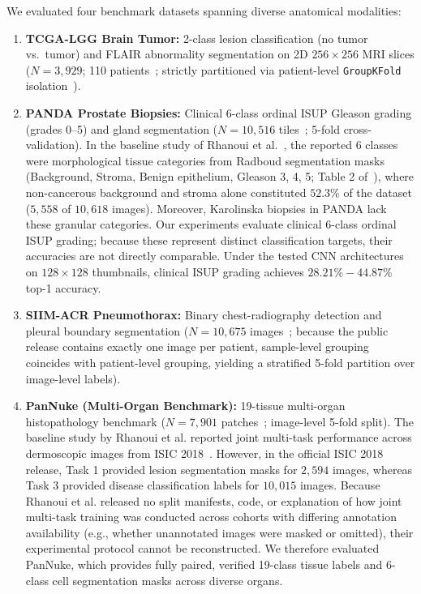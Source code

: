 \documentclass[preprint,12pt]{elsarticle}
\begin{document}
We evaluated four benchmark datasets spanning diverse anatomical modalities:
\begin{enumerate}
    \item \textbf{TCGA-LGG Brain Tumor:} 2-class lesion classification (no tumor vs.\ tumor) and FLAIR abnormality segmentation on 2D $256 \times 256$ MRI slices ($N=3,929$; 110 patients~\cite{buda2019lgg}; strictly partitioned via patient-level \texttt{GroupKFold} isolation~\cite{pedregosa2011sklearn}).
    \item \textbf{PANDA Prostate Biopsies:} Clinical 6-class ordinal ISUP Gleason grading (grades 0--5) and gland segmentation ($N=10,516$ tiles~\cite{bulten2022artificial}; 5-fold cross-validation). In the baseline study of Rhanoui et al.~\cite{rhanoui2025multitask}, the reported 6 classes were morphological tissue categories from Radboud segmentation masks (Background, Stroma, Benign epithelium, Gleason 3, 4, 5; Table 2 of~\cite{rhanoui2025multitask}), where non-cancerous background and stroma alone constituted $52.3\%$ of the dataset ($5,558$ of $10,618$ images). Moreover, Karolinska biopsies in PANDA lack these granular categories. Our experiments evaluate clinical 6-class ordinal ISUP grading; because these represent distinct classification targets, their accuracies are not directly comparable. Under the tested CNN architectures on $128 \times 128$ thumbnails, clinical ISUP grading achieves $28.21\%-44.87\%$ top-1 accuracy.
    \item \textbf{SIIM-ACR Pneumothorax:} Binary chest-radiography detection and pleural boundary segmentation ($N=10,675$ images~\cite{siim2019pneumothorax}; because the public release contains exactly one image per patient, sample-level grouping coincides with patient-level grouping, yielding a stratified 5-fold partition over image-level labels).
    \item \textbf{PanNuke (Multi-Organ Benchmark):} 19-tissue multi-organ histopathology benchmark ($N=7,901$ patches~\cite{gamper2020pannuke}; image-level 5-fold split). The baseline study by Rhanoui et al. reported joint multi-task performance across dermoscopic images from ISIC 2018~\cite{codella2019isic}. However, in the official ISIC 2018 release, Task 1 provided lesion segmentation masks for $2,594$ images, whereas Task 3 provided disease classification labels for $10,015$ images. Because Rhanoui et al. released no split manifests, code, or explanation of how joint multi-task training was conducted across cohorts with differing annotation availability (e.g., whether unannotated images were masked or omitted), their experimental protocol cannot be reconstructed. We therefore evaluated PanNuke, which provides fully paired, verified 19-class tissue labels and 6-class cell segmentation masks across diverse organs.
\end{enumerate}
\end{document}
